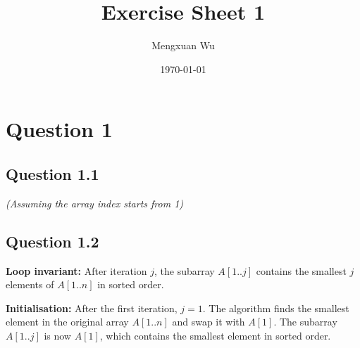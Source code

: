 \documentclass{ctexart}
\title{Exercise Sheet 1}
\author{Mengxuan Wu}
\date{\today}
\begin{document}
\maketitle

\section*{Question 1}
\subsection*{Question 1.1}

\begin{center}
\end{center}

\textit{(Assuming the array index starts from 1)}

\subsection*{Question 1.2}

\textbf{Loop invariant:} After iteration $j$, the subarray $A[1..j]$ contains the smallest $j$ elements of $A[1..n]$ in sorted order.

\textbf{Initialisation:} After the first iteration, $j = 1$. The algorithm finds the smallest element in the original array $A[1..n]$ and swap it with $A[1]$. 
The subarray $A[1..j]$ is now $A[1]$, which contains the smallest element in sorted order.
\end{document}
